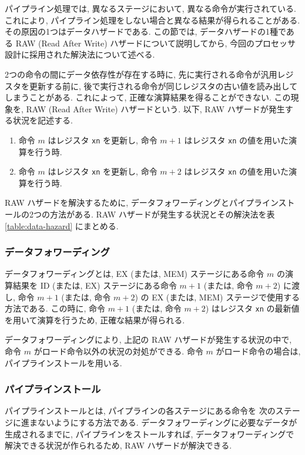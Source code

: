 \documentclass[../specifications.tex]{subfiles}
\begin{document}
  パイプライン処理では, 異なるステージにおいて, 異なる命令が実行されている.
  これにより, パイプライン処理をしない場合と異なる結果が得られることがある.
  その原因の1つはデータハザードである.
  この節では, データハザードの1種である RAW (Read After Write) ハザードについて説明してから, 
  今回のプロセッサ設計に採用された解決法について述べる.

  2つの命令の間にデータ依存性が存在する時に, 
  先に実行される命令が汎用レジスタを更新する前に, 
  後で実行される命令が同じレジスタの古い値を読み出してしまうことがある.
  これによって, 正確な演算結果を得ることができない.
  この現象を, RAW (Read After Write) ハザードという.
  以下, RAW ハザードが発生する状況を記述する.

  \begin{enumerate}
    \item 命令 $m$ はレジスタ \verb|xn| を更新し, 
    命令 $m+1$ はレジスタ \verb|xn| の値を用いた演算を行う時.

    \item 命令 $m$ はレジスタ \verb|xn| を更新し, 
    命令 $m+2$ はレジスタ \verb|xn| の値を用いた演算を行う時.
  \end{enumerate}

  RAW ハザードを解決するために, データフォワーディングとパイプラインストールの2つの方法がある.
  RAW ハザードが発生する状況とその解決法を表 \ref{table:data-hazard} にまとめる.

  \subsubsection{データフォワーディング}
  データフォワーディングとは, EX (または, MEM) ステージにある命令 $m$ の演算結果を
  ID (または, EX) ステージにある命令 $m+1$ (または, 命令 $m+2$) に渡し, 
  命令 $m+1$ (または, 命令 $m+2$) の EX (または, MEM) ステージで使用する方法である.
  この時に, 命令 $m+1$ (または, 命令 $m+2$) はレジスタ \verb|xn| の最新値
  を用いて演算を行うため, 正確な結果が得られる.

  データフォワーディングにより, 上記の RAW ハザードが発生する状況の中で, 
  命令 $m$ がロード命令以外の状況の対処ができる.
  命令 $m$ がロード命令の場合は, パイプラインストールを用いる.

  \subsubsection{パイプラインストール}
  パイプラインストールとは, パイプラインの各ステージにある命令を
  次のステージに進まないようにする方法である.
  データフォワーディングに必要なデータが生成されるまでに, 
  パイプラインをストールすれば, データフォワーディングで解決できる状況が作られるため, 
  RAW ハザードが解決できる.
\end{document}
